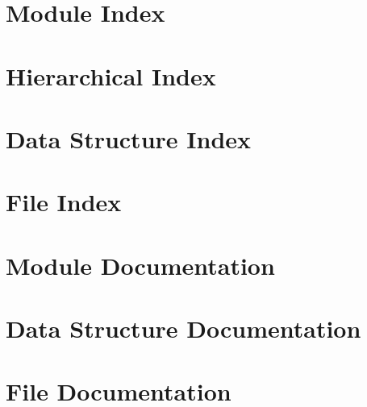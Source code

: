 \documentclass[twoside]{book}
\newcommand{\+}{\discretionary{\mbox{\scriptsize$\hookleftarrow$}}{}{}}
\newcommand{\clearemptydoublepage}{%
  \newpage{\pagestyle{empty}\cleardoublepage}%
}
\begin{document}
\chapter{Module Index}

\chapter{Hierarchical Index}

\chapter{Data Structure Index}

\chapter{File Index}

\chapter{Module Documentation}































\chapter{Data Structure Documentation}



























\chapter{File Documentation}


\backmatter
\newpage
{}
\clearemptydoublepage
{}
\printindex
\end{document}
